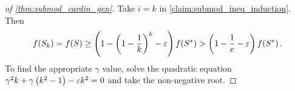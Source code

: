 \begin{proof}[of \cref{thm:submod_cardin_gen}]
    Take $i = k$ in \cref{claim:submod_ineq_induction}. Then 
    \begin{equation*}
        f \! \left( S_k \right) = f \! \left( S \right) \geq \left( 1 - \left( 1 - \frac{1}{k} \right)^k - \varepsilon \right)f \! \left( S^{\ast} \right) > \left( 1 - \frac{1}{e} - \varepsilon \right)f \! \left( S^{\ast} \right). 
    \end{equation*}
    To find the appropriate $\gamma$ value, solve the quadratic equation $\gamma^2k + \gamma \left( k^2-1 \right) - \varepsilon k^2 = 0$ and take the non-negative root.  
\end{proof}

